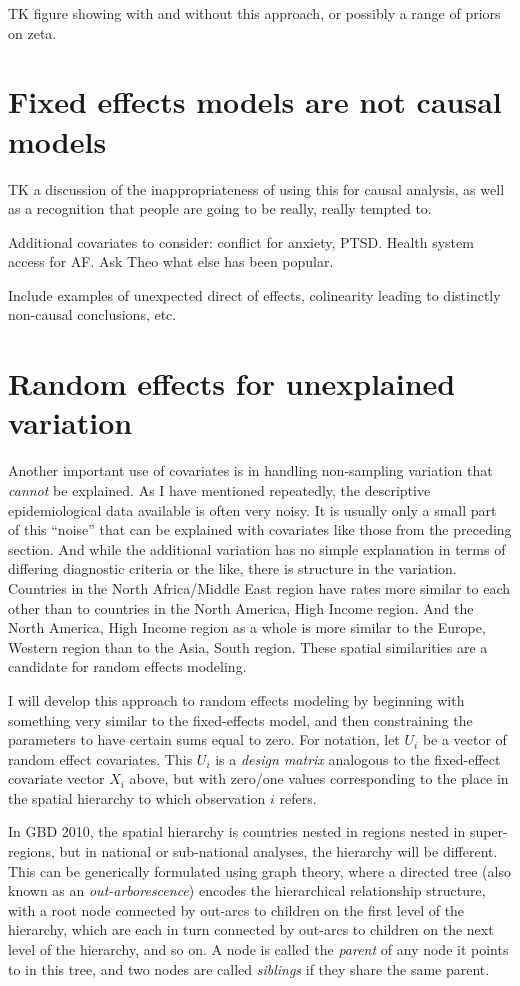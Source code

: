 TK figure showing with and without this approach, or possibly a range
of priors on zeta.


\section{Fixed effects models are not causal models}
TK a discussion of the inappropriateness of using this for causal
analysis, as well as a recognition that people are going to be really,
really tempted to.

Additional covariates to consider: conflict for anxiety, PTSD. Health
system access for AF.  Ask Theo what else has been popular.

Include examples of unexpected direct of effects, colinearity leading
to distinctly non-causal conclusions, etc.

\section{Random effects for unexplained variation}
Another important use of covariates is in handling non-sampling
variation that \emph{cannot} be explained. As I have mentioned
repeatedly, the descriptive epidemiological data available is often
very noisy.  It is usually only a small part of this ``noise''
that can be explained with covariates like those from the preceding
section. And while the additional variation has no simple explanation
in terms of differing diagnostic criteria or the like, there is
structure in the variation. Countries in the North Africa/Middle East
region have rates more similar to each other than to countries in the
North America, High Income region.  And the North America, High Income
region as a whole is more similar to the Europe, Western region than
to the Asia, South region.  These spatial similarities are a candidate
for random effects modeling.

I will develop this approach to random effects modeling by beginning
with something very similar to the fixed-effects model, and then
constraining the parameters to have certain sums equal to zero.  For
notation, let $U_i$ be a vector of random effect covariates.  This
$U_i$ is a \emph{design matrix} analogous to the fixed-effect
covariate vector $X_i$ above, but with zero/one values corresponding
to the place in the spatial hierarchy to which observation $i$ refers.

In GBD 2010, the spatial hierarchy is countries nested in regions
nested in super-regions, but in national or sub-national analyses, the
hierarchy will be different. This can be generically formulated using
graph theory, where a directed tree (also known as an
\emph{out-arborescence}) encodes the hierarchical relationship
structure, with a root node connected by out-arcs to children on the
first level of the hierarchy, which are each in turn connected by
out-arcs to children on the next level of the hierarchy, and so on.  A
node is called the \emph{parent} of any node it points to in this
tree, and two nodes are called \emph{siblings} if they share the same
parent.


